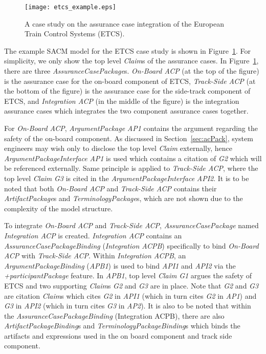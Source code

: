 \begin{figure}
	\centering
	\texttt{[image: etcs\_example.eps]}
	\caption{A case study on the assurance case integration of the European Train Control Systems (ETCS).}
	\label{fig:etcs_example}
\end{figure}

The example SACM model for the ETCS case study is shown in Figure~\ref{fig:etcs_example}. 
For simplicity, we only show the top level \textit{Claim}s of the assurance cases. In Figure~\ref{fig:etcs_example}, there are three \textit{AssuranceCasePackage}s. 
\textit{On-Board ACP} (at the top of the figure) is the assurance case for the on-board component of ETCS, \textit{Track-Side ACP} (at the bottom of the figure) is the assurance case for the side-track component of ETCS, and \textit{Integration ACP} (in the middle of the figure) is the integration assurance cases which integrates the two component assurance cases together. 

For \textit{On-Board ACP}, \textit{ArgumentPackage} \textit{AP1} contains the argument regarding the safety of the on-board component. 
As discussed in Section~\ref{sec:acPack}, system engineers may wish only to disclose the top level \textit{Claim} externally, hence \textit{ArgumentPackageInterface} \textit{AP1} is used which contains a citation of \textit{G2} which will be referenced externally. 
Same principle is applied to \textit{Track-Side ACP}, where the top level \textit{Claim} \textit{G3} is cited in the \textit{ArgumentPackageInterface} \textit{API2}. 
It is to be noted that both \textit{On-Board ACP} and \textit{Track-Side ACP} contains their \textit{ArtifactPackage}s and \textit{TerminologyPackage}s, which are not shown due to the complexity of the model structure. 

To integrate \textit{On-Board ACP} and \textit{Track-Side ACP}, \textit{AssuranceCasePackage} named \textit{Integration ACP} is created. 
\textit{Integration ACP} contains an \textit{AssuranceCasePackageBinding} (\textit{Integration ACPB}) specifically to bind \textit{On-Board ACP} with \textit{Track-Side ACP}. 
Within \textit{Integration ACPB}, an \textit{ArgumentPackageBinding} (\textit{APB1}) is used to bind \textit{API1} and \textit{API2} via the \textit{+participantPackage} feature. 
In \textit{APB1}, top level \textit{Claim} \textit{G1} argues the safety of ETCS and two supporting \textit{Claim}s \textit{G2} and \textit{G3} are in place. 
Note that \textit{G2} and \textit{G3} are citation \textit{Claim}s which cites \textit{G2} in \textit{API1} (which in turn cites \textit{G2} in \textit{AP1}) and \textit{G3} in \textit{API2} (which in turn cites \textit{G3} in \textit{AP2}). 
It is also to be noted that within the \textit{AssuranceCasePackageBinding} (Integration ACPB), there are also \textit{ArtifactPackageBinding}s and \textit{TerminologyPackageBinding}s which binds the artifacts and expressions used in the on board component and track side component. 

